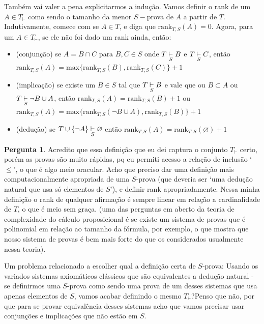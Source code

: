 \documentclass[11pt]{article}
\renewcommand{\textit}[1]{{\fakeitalic#1}}
\theoremstyle{definition}
\theoremstyle{definition}
\theoremstyle{definition}
\theoremstyle{definition}
\theoremstyle{definition}
\theoremstyle{definition}
\theoremstyle{definition}
\theoremstyle{definition}
\theoremstyle{definition}
\theoremstyle{definition}
\theoremstyle{definition}
\theoremstyle{definition}
\theoremstyle{definition}
\theoremstyle{definition}
\newtheorem{preguta}{Pergunta}
\newenvironment{pergunta}{
\definecolor{shadecolor}{HTML}{FFF8F0}
\begin{shaded}
\begin{preguta}
}
{
\end{preguta}
\end{shaded}
}
\begin{document}
Também vai valer a pena explicitarmos a indução. Vamos definir o \textit{rank} de um $A \in T_{\vdash}$ como sendo o tamanho da menor $S-$prova de $A$ a partir de $T$. Indutivamente, comece com se $A \in T$, e diga que $\text{rank}_{T,S}(A) = 0$. Agora, para um $A \in T_{\vdash}$, se ele não foi dado um rank ainda, então: 

  \begin{itemize}[label=]
    \item (conjunção) se $A = B \cap C$ para $B,C \in S$ onde $T \underset{S}{\vdash} B$ e $T \underset{S}{\vdash} C$, então $\text{rank}_{T,S}(A) = \text{max}\{\text{rank}_{T,S}(B), \text{rank}_{T,S}(C)\} + 1$
    \item (implicação) se existe um $B \in S$ tal que $T \underset{S}{\vdash} B$ e vale que ou $B \subset A$ ou $T \underset{S}{\vdash} \lnot B \cup A$, então $\text{rank}_{T,S}(A) = \text{rank}_{T,S}(B) + 1$ ou $\text{rank}_{T,S}(A) = \text{max}\{\text{rank}_{T,S}(\lnot B \cup A), \text{rank}_{T,S}(B) \} + 1$
    \item (dedução) se $T \cup \{\lnot A\} \underset{S}{\vdash} \varnothing $ então $\text{rank}_{T,S}(A) = \text{rank}_{T,S}(\varnothing) + 1$
  \end{itemize}


\begin{pergunta}
  Acredito que essa definição que eu dei captura o conjunto $T_{\vdash}$ certo, porém as provas são muito rápidas, pq eu permiti acesso a relação de inclusão `$\leq$', o que é algo meio oracular. Acho que preciso dar uma definição mais computacionalmente apropriada de uma $S$-prova (que deveria ser `uma dedução natural que usa só elementos de $S$'), e definir rank apropriadamente. Nessa minha definição o rank de qualquer afirmação é sempre linear em relação a cardinalidade de $T$, o que é meio sem graça. (uma das perguntas em aberto da teoria de complexidade do cálculo proposicional é se existe um sistema de provas que é polinomial em relação ao tamanho da fórmula, por exemplo, o que mostra que nosso sistema de provas é bem mais forte do que os considerados usualmente nessa teoria).

  Um problema relacionado a escolher qual a definição certa de $S$-prova: Usando os variados sistemas axiomáticos clássicos que são equivalentes a dedução natural - se definirmos uma $S$-prova como sendo uma prova de um desses sistemas que usa apenas elementos de $S$, vamos acabar definindo o mesmo $T_{\vdash}$?Penso que não, por que para se provar equivalência desses sistemas acho que vamos precisar usar conjunções e implicações que não estão em $S$.
\end{pergunta}
\end{document}
